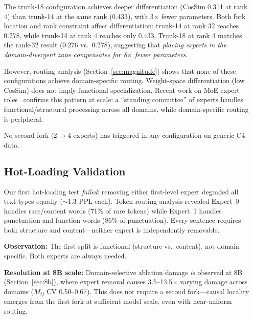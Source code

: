 \documentclass{article}
\begin{document}
The trunk-18 configuration achieves deeper differentiation (CosSim 0.311 at
rank 4) than trunk-14 at the same rank (0.433), with 3$\times$ fewer
parameters. Both fork location and rank constraint affect differentiation:
trunk-14 at rank 32 reaches 0.278, while trunk-14 at rank 4 reaches only
0.433. Trunk-18 at rank 4 matches the rank-32 result (0.276 vs.\ 0.278),
suggesting that \emph{placing experts in the domain-divergent zone compensates
for 8$\times$ fewer parameters}.

However, routing analysis (Section~\ref{sec:magnitude}) shows that none of
these configurations achieve domain-specific routing. Weight-space
differentiation (low CosSim) does not imply functional specialization. Recent
work on MoE expert roles~\cite{standing2026} confirms this pattern at scale:
a ``standing committee'' of experts handles functional/structural processing
across all domains, while domain-specific routing is peripheral.

No second fork (2$\to$4 experts) has triggered in any configuration on
generic C4 data.

\subsection{Hot-Loading Validation}
\label{sec:hotloading}

Our first hot-loading test \emph{failed}: removing either first-level expert
degraded all text types equally ($\sim$1.3 PPL each). Token routing analysis
revealed Expert~0 handles rare/content words (71\% of rare tokens) while
Expert~1 handles punctuation and function words (86\% of punctuation). Every
sentence requires both structure and content---neither expert is independently
removable.

\textbf{Observation:} The first split is functional (structure vs.\ content),
not domain-specific. Both experts are always needed.

\textbf{Resolution at 8B scale:} Domain-selective ablation damage \emph{is}
observed at 8B (Section~\ref{sec:8b}), where expert removal causes
3.5--13.5$\times$ varying damage across domains ($M_{ij}$ CV 0.50--0.67).
This does not require a second fork---causal locality emerges from the
first fork at sufficient model scale, even with near-uniform routing.
\end{document}
